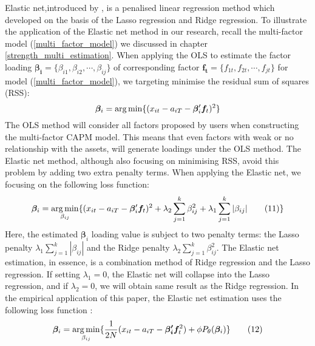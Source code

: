 Elastic net,introduced by ,  is a penalised linear regression method which developed on the basis of the Lasso regression \cite{Tibshirani1996} and Ridge regression.
To illustrate the application of the Elastic net method in our research, recall the multi-factor model (\ref{multi_factor_model}) we discussed in chapter \ref{strength_multi_estimation}.
When applying the OLS to estimate the factor loading $\bm{\beta_{i}} = \{ \beta_{i1}, \beta_{i2}, \cdots, \beta_{ij}   \}$ of corresponding factor $\bm{f_{t}} = \{ f_{1t}, f_{2t}, \cdots, f_{jt} \}$ for model (\ref{multi_factor_model}), we targeting minimise the residual sum of squares (RSS):
\[  \bm{\beta}_i =   \operatorname*{arg\,min}\{  (x_{it} - a_{iT} - \bm{\beta}_i^{\prime}\bm{f}_t )^2 \}    \]
The OLS method will consider all factors proposed by users when constructing the multi-factor CAPM model.
This means that even factors with weak or no relationship with the assets, will generate loadings under the OLS method.
The Elastic net method, although also focusing on minimising RSS, avoid this problem by adding two extra penalty terms.
When applying the Elastic net, we focusing on the following loss function:
\[   \bm{\beta}_{i}  = \operatorname*{arg\,min}_{\beta_{ij}}\{ (x_{it} - a_{iT} - \bm{\beta}_{i} ^{\prime}\bm{f}_{t})^2 + \lambda_2\sum_{j = 1}^k\beta_{ij}^2  + \lambda_1\sum_{j=1}^k|\beta_{ij}|  \label{ENcriterion} \tag{11}   \}    \]
Here, the estimated $\bm{\beta}_i$ loading value is subject to two penalty terms: the Lasso penalty $\lambda_1\sum_{j=1}^k|\beta_{ij}|$ and the Ridge penalty $\lambda_2\sum_{j = 1}^k\beta_{ij}^2$.
The Elastic net estimation, in essence, is a combination method of Ridge regression and the Lasso regression.
If setting $\lambda_1 = 0$, the Elastic net will collapse into the Lasso regression, and if $\lambda_2 = 0$, we will obtain same result as the Ridge regression.
In the empirical application of this paper, the Elastic net estimation uses the following loss function \cite{Friedman2010}:
\[		\bm{\beta}_{i} = \operatorname*{arg\,min}_{\beta_{ij}}\{ \frac{1}{2N} (x_{it}-a_{iT} - \bm{\beta_{i}^{\prime}}\bm{f}_t ^2 ) +\phi P_{\theta}(\bm{\beta}_i)  \} \label{EN:empirical_formula}\tag{12} \]
